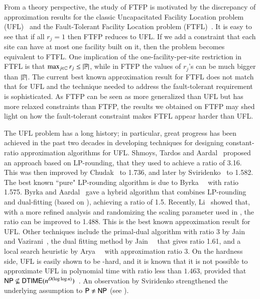 From a theory perspective, the study of FTFP is motivated by
the discrepancy of approximation results for the classic
Uncapacitated Facility Location problem
(UFL)~\cite{ShmoysTA97} and the Fault-Tolerant Facility
Location problem (FTFL)~\cite{JainV03}.  It is easy to see
that if all $r_j=1$ then FTFP reduces to UFL.  If we add a
constraint that each site can have at most one facility
built on it, then the problem becomes equivalent to
FTFL. One implication of the one-facility-per-site
restriction in FTFL is that $\max_{j\in\mathbb{C}}r_j \leq
|\mathbb{F}|$, while in FTFP the values of $r_j$'s can be
much bigger than $|\mathbb{F}|$. The current best known
approximation result for FTFL does not match that for UFL
and the technique needed to address the fault-tolerant
requirement is sophisticated. As FTFP can be seen as more
generalized than UFL but has more relaxed constraints than
FTFP, the results we obtained on FTFP may shed light on how
the fault-tolerant constraint makes FTFL appear harder than
UFL.

The UFL problem has a long history; in particular, great
progress has been achieved in the past two decades in
developing techniques for designing constant-ratio
approximation algorithms for UFL.  Shmoys, Tardos and
Aardal~\cite{ShmoysTA97} proposed an approach based on
LP-rounding, that they used to achieve a ratio of 3.16.
This was then improved by Chudak~\cite{ChudakS04} to 1.736,
and later by Sviridenko~\cite{Svi02} to 1.582.  The best
known ``pure" LP-rounding algorithm is due to
Byrka~{\etal}~\cite{ByrkaGS10} with ratio 1.575.  Byrka and
Aardal~\cite{ByrkaA10} gave a hybrid algorithm that combines
LP-rounding and dual-fitting (based on \cite{JainMMSV03}),
achieving a ratio of 1.5.  Recently, Li~\cite{Li11} showed
that, with a more refined analysis and randomizing the
scaling parameter used in \cite{ByrkaA10}, the ratio can be
improved to 1.488. This is the best known approximation
result for UFL.  Other techniques include the primal-dual
algorithm with ratio 3 by Jain and Vazirani~\cite{JainV01},
the dual fitting method by Jain~{\etal}~\cite{JainMMSV03}
that gives ratio 1.61, and a local search heuristic by
Arya~{\etal}~\cite{AryaGKMMP04} with approximation ratio 3.
On the hardness side, UFL is easily shown to be {\NP}-hard,
and it is known that it is not possible to approximate UFL
in polynomial time with ratio less than $1.463$, provided
that ${\mbox{\sf NP}}\not\subseteq{\mbox{\sf DTIME}}(n^{O(\log\log
  n)})$~\cite{GuhaK98}. An observation by Sviridenko
strengthened the underlying assumption to ${\mbox{\sf P}}\ne {\mbox{\sf NP}}$ (see
\cite{vygen05}).

